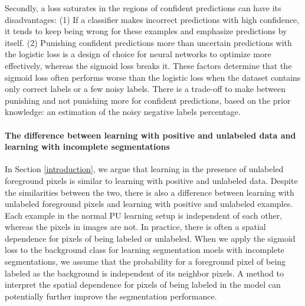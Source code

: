 Secondly, a loss saturates in the regions of confident predictions can have its disadvantages:
(1) If a classifier makes incorrect predictions with high confidence, it tends to keep being wrong for these examples and emphasize predictions by itself.
(2) Punishing confident predictions more than uncertain predictions with the logistic loss is a design of choice for neural networks to optimize more effectively, whereas the sigmoid loss breaks it.
These factors determine that the sigmoid loss often performs worse than the logistic loss when the dataset contains only correct labels or a few noisy labels.
There is a trade-off to make between punishing and not punishing more for confident predictions, based on the prior knowledge: an estimation of the noisy negative labels percentage.



\paragraph{The difference between learning with positive and unlabeled data and learning with incomplete segmentations}
In Section \ref{introduction}, we argue that learning in the presence of unlabeled foreground pixels is similar to learning with positive and unlabeled data.
Despite the similarities between the two, there is also a difference between learning with unlabeled foreground pixels and learning with positive and unlabeled examples.
Each example in the normal PU learning setup is independent of each other, whereas the pixels in images are not.
In practice, there is often a spatial dependence for pixels of being labeled or unlabeled.
When we apply the sigmoid loss to the background class for learning segmentation moels with incomplete segmentations, we assume that the probability for a foreground pixel of being labeled as the background is independent of its neighbor pixels.
A method to interpret the spatial dependence for pixels of being labeled in the model can potentially further improve the segmentation performance.






